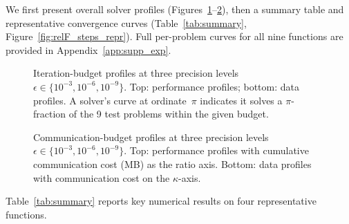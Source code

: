 \documentclass[review,onefignum,onetabnum]{siamart171218}
\begin{document}
	We first present overall solver profiles (Figures~\ref{fig:profiles}--\ref{fig:profiles_comm}),
	then a summary table and representative convergence curves
	(Table~\ref{tab:summary}, Figure~\ref{fig:relF_steps_repr}).
	Full per-problem curves for all nine functions are provided in
	Appendix~\ref{app:supp_exp}.
	
	
	\begin{figure}[htbp]
		\centering
		\caption{Iteration-budget profiles at three precision levels
			$\epsilon\in\{10^{-3},10^{-6},10^{-9}\}$.
			Top: performance profiles; bottom: data profiles.
			A solver's curve at ordinate~$\pi$ indicates it solves a
			$\pi$-fraction of the 9 test problems within the given budget.}
		\label{fig:profiles}
	\end{figure}
	
	\begin{figure}[htbp]
		\centering
		\caption{Communication-budget profiles at three precision levels
			$\epsilon\in\{10^{-3},10^{-6},10^{-9}\}$.
			Top: performance profiles with cumulative communication cost (MB)
			as the ratio axis.
			Bottom: data profiles with communication cost on the $\kappa$-axis.}
		\label{fig:profiles_comm}
	\end{figure}
	Table~\ref{tab:summary} reports key numerical results on four
	representative functions.
	
\end{document}
